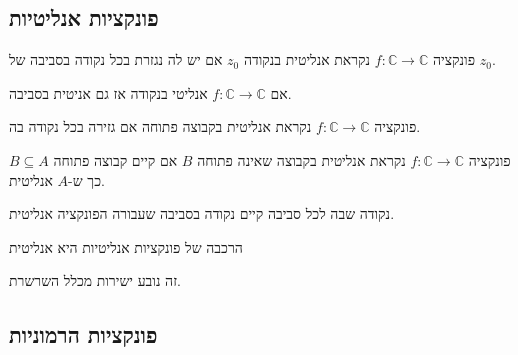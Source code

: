 \documentclass{tstextbook}
\begin{document}
\subsection{פונקציות אנליטיות}

\begin{definition}
פונקציה \(f:\mathbb{C}\to \mathbb{C}\) נקראת אנליטית בנקודה \(z_{0}\) אם יש לה נגזרת בכל נקודה בסביבה של \(z_{0}\).

\end{definition}
\begin{corollary}
אם \(f:\mathbb{C}\to\mathbb{C}\) אנליטי בנקודה אז גם אניטית בסביבה.

\end{corollary}
\begin{definition}
פונקציה \(f:\mathbb{C}\to \mathbb{C}\) נקראת אנליטית בקבוצה פתוחה אם גזירה בכל נקודה בה.

\end{definition}
\begin{definition}
פונקציה \(f:\mathbb{C}\to \mathbb{C}\) נקראת אנליטית בקבוצה שאינה פתוחה \(B\) אם קיים קבוצה פתוחה \(B\subseteq A\) כך ש-\(A\) אנליטית.

\end{definition}
\begin{definition}
נקודה שבה לכל סביבה קיים נקודה בסביבה שעבורה הפונקציה אנליטית.

\end{definition}
\begin{proposition}
הרכבה של פונקציות אנליטיות היא אנליטית

\end{proposition}
זה נובע ישירות מכלל השרשרת.

\subsection{פונקציות הרמוניות}
\end{document}
